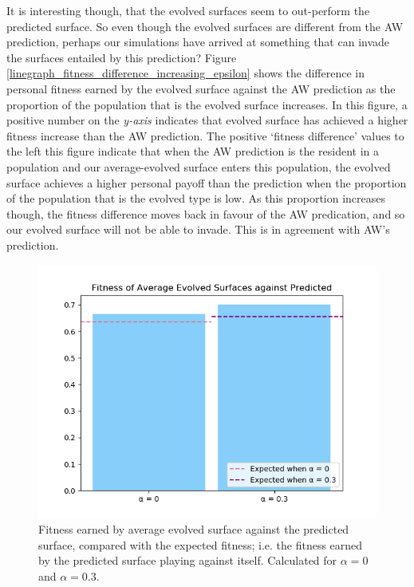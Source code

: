 \documentclass[11pt]{book}
\newcommand*{\np}{\par\noindent\newline}
\begin{document}
\np It is interesting though, that the evolved surfaces seem to out-perform the predicted surface.
So even though the evolved surfaces are different from the AW prediction, perhaps our simulations have arrived at something that can invade the surfaces entailed by this prediction?
Figure \ref{linegraph_fitness_difference_increasing_epsilon} shows the difference in personal fitness earned by the evolved surface against the AW prediction as the proportion of the population  that is the evolved surface increases.
In this figure, a positive number on the \textit{y-axis} indicates that evolved surface has achieved a higher fitness increase than the AW prediction.
The positive `fitness difference' values to the left this figure indicate that when the AW prediction is the resident in a population and our average-evolved surface enters this population,
the evolved surface achieves a higher personal payoff than the prediction when the proportion of the population that is the evolved type is low.
As this proportion increases though, the fitness difference moves back in favour of the AW predication, and so our evolved surface will not be able to invade.
This is in agreement with AW's prediction.
\begin{figure}
	\centering
	\includegraphics[scale=0.6]{resources/phenotype_barchart_fitness_earned_against_target_r_00_03.png}
	\caption{Fitness earned by average evolved surface against the predicted surface, compared with the expected fitness; i.e. the fitness earned by the predicted surface playing against itself. Calculated for $\alpha = 0$ and $\alpha = 0.3$.}
	\label{phenotype_barchart_fitness_earned_against_target_r_00_03}
\end{figure}
\end{document}
